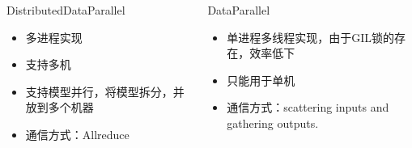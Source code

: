 \documentclass[algorithm,pgfplots]{cuzbeamer}
\begin{document}
    \begin{fragile}[DataParallel与DistributedDataParallel对比]
        \begin{columns}[T,onlytextwidth]
            \begin{block}{DistributedDataParallel}
                \begin{itemize}
                    \item 多进程实现
                    \item 支持多机
                    \item 支持模型并行，将模型拆分，并放到多个机器
                    \item 通信方式：{\ttfamily Allreduce} 
                \end{itemize}
            \end{block}
            \begin{block}{DataParallel}
                \begin{itemize}
                    \item 单进程多线程实现，由于GIL锁的存在，效率低下
                    \item 只能用于单机
                    \item 通信方式：scattering inputs and gathering outputs.
                \end{itemize}
            \end{block}
        \end{columns}
    \end{fragile}
\end{document}

